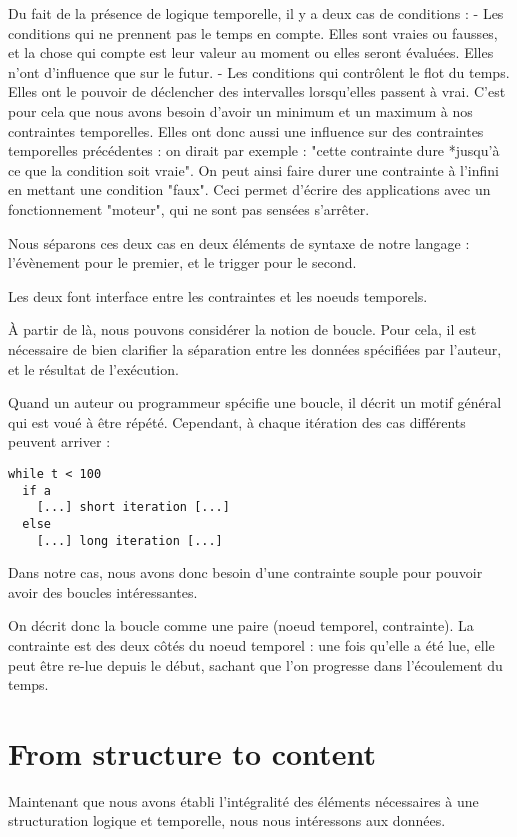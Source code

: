\documentclass{sigchi}
\begin{document}
Du fait de la présence de logique temporelle, il y a deux cas de conditions : 
- Les conditions qui ne prennent pas le temps en compte. Elles sont vraies ou fausses, et la chose qui compte est leur valeur au moment ou elles seront évaluées. Elles n'ont d'influence que sur le futur.
- Les conditions qui contrôlent le flot du temps. Elles ont le pouvoir de déclencher des intervalles lorsqu'elles passent à vrai. C'est pour cela que nous avons besoin d'avoir un minimum et un maximum à nos contraintes temporelles. Elles ont donc aussi une influence sur des contraintes temporelles précédentes : on dirait par exemple : "cette contrainte dure *jusqu'à ce que la condition soit vraie". On peut ainsi faire durer une contrainte à l'infini en mettant une condition "faux". Ceci permet d'écrire des applications avec un fonctionnement "moteur", qui ne sont pas sensées s'arrêter.

Nous séparons ces deux cas en deux éléments de syntaxe de notre langage : l'évènement pour le premier, et le trigger pour le second.

Les deux font interface entre les contraintes et les noeuds temporels.

À partir de là, nous pouvons considérer la notion de boucle. Pour cela, il est nécessaire de bien clarifier la séparation entre les données spécifiées par l'auteur, et le résultat de l'exécution.

Quand un auteur ou programmeur spécifie une boucle, il décrit un motif général qui est voué à être répété. Cependant, à chaque itération des cas différents peuvent arriver : 

\begin{lstlisting}
while t < 100
  if a
    [...] short iteration [...]
  else
    [...] long iteration [...]           
\end{lstlisting}

Dans notre cas, nous avons donc besoin d'une contrainte souple pour pouvoir avoir des boucles intéressantes. 

On décrit donc la boucle comme une paire (noeud temporel, contrainte). La contrainte est des deux côtés du noeud temporel : une fois qu'elle a été lue, elle peut être re-lue depuis le début, sachant que l'on progresse dans l'écoulement du temps.


\section{From structure to content}
Maintenant que nous avons établi l'intégralité des éléments nécessaires à une structuration logique et temporelle, nous nous intéressons aux données.
\end{document}
